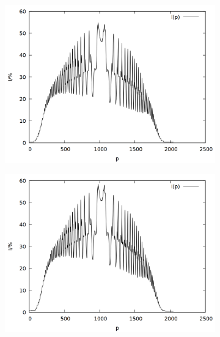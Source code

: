 \begin{figure}
\centering
\begin{subfigure}{0.45\textwidth}
\includegraphics[width=\textwidth]{data/zeeman/out_6_0_raw.png}
\end{subfigure}
\begin{subfigure}{0.45\textwidth}
\includegraphics[width=\textwidth]{data/zeeman/out_6_3_raw.png}
\end{subfigure}
\begin{subfigure}{0.45\textwidth}

\end{subfigure}
\end{figure}
